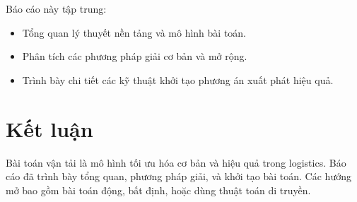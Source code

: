 \documentclass[oneside, a4paper]{book}
\renewcommand{\thesection}{\arabic{chapter}.\arabic{section}}
\theoremstyle{plain}
\theoremstyle{definition}
\theoremstyle{definition}
\theoremstyle{remark}
\begin{document}
Báo cáo này tập trung:
\begin{itemize}
    \item Tổng quan lý thuyết nền tảng và mô hình bài toán.
    \item Phân tích các phương pháp giải cơ bản và mở rộng.
    \item Trình bày chi tiết các kỹ thuật khởi tạo phương án xuất phát hiệu quả.
\end{itemize}


\clearpage


\clearpage


\clearpage

\chapter{Kết luận}
Bài toán vận tải là mô hình tối ưu hóa cơ bản và hiệu quả trong logistics. Báo cáo đã trình bày tổng quan, phương pháp giải, và khởi tạo bài toán. Các hướng mở bao gồm bài toán động, bất định, hoặc dùng thuật toán di truyền.



\end{document}
